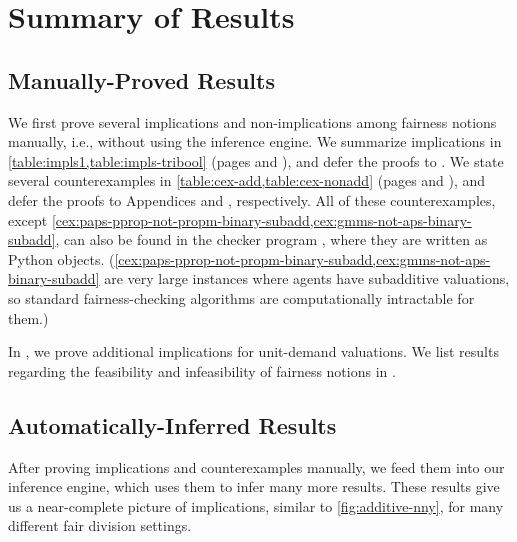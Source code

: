 \section{Summary of Results}
\label{sec:summary}

\subsection{Manually-Proved Results}
\label{sec:summary:manual}

We first prove several implications and non-implications among fairness notions manually,
i.e., without using the inference engine.
We summarize implications in \cref{table:impls1,table:impls-tribool}
(pages \pageref{table:impls1} and \pageref{table:impls-tribool}),
and defer the proofs to .
We state several counterexamples in \cref{table:cex-add,table:cex-nonadd}
(pages \pageref{table:cex-add} and \pageref{table:cex-nonadd}),
and defer the proofs to Appendices  and , respectively.
All of these counterexamples, except \cref{cex:paps-pprop-not-propm-binary-subadd,cex:gmms-not-aps-binary-subadd},
can also be found in the checker program \citep{fd-cex-checker}, where they are written as Python objects.
(\cref{cex:paps-pprop-not-propm-binary-subadd,cex:gmms-not-aps-binary-subadd}
are very large instances where agents have subadditive valuations,
so standard fairness-checking algorithms are computationally intractable for them.)

In , we prove additional implications for unit-demand valuations.
We list results regarding the feasibility and infeasibility of fairness notions in .

\subsection{Automatically-Inferred Results}
\label{sec:summary:auto}

After proving implications and counterexamples manually,
we feed them into our inference engine, which uses them to infer many more results.
These results give us a near-complete picture of implications,
similar to \cref{fig:additive-nny}, for many different fair division settings.

